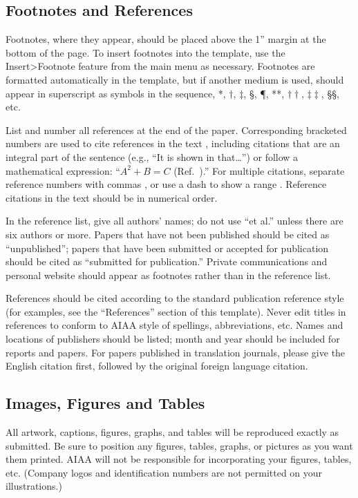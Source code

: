 \subsection{Footnotes and References}
Footnotes, where they appear, should be placed above the 1'' margin at the bottom of the page. To insert footnotes into the template, use the Insert>Footnote feature from the main menu as necessary. Footnotes are formatted automatically in the template, but if another medium is used, should appear in superscript as symbols in the sequence, *, $\dag$, $\ddag$, \S, \P, **, $\dag\dag$, $\ddag\ddag$, \S\S, etc.

List and number all references at the end of the paper. Corresponding bracketed numbers are used to cite references in the text \cite{vatistas1986reverse}, including citations that are an integral part of the sentence (e.g., ``It is shown in \cite{dornheim1996planetary} that\ldots '') or follow a mathematical expression: ``$A^{2} + B = C$ (Ref.~\cite{terster1997nasa}).'' For multiple citations, separate reference numbers with commas \cite{peyret2012computational,oates1997aerothermodynamics}, or use a dash to show a range \cite{volpe1994techniques,thompsonspacecraft,chi1993fluid}. Reference citations in the text should be in numerical order.

In the reference list, give all authors' names; do not use ``et al.'' unless there are six authors or more. Papers that have not been published should be cited as ``unpublished''; papers that have been submitted or accepted for publication should be cited as ``submitted for publication.'' Private communications and personal website should appear as footnotes rather than in the reference list.

References should be cited according to the standard publication reference style (for examples, see the ``References'' section of this template). Never edit titles in references to conform to AIAA style of spellings, abbreviations, etc. Names and locations of publishers should be listed; month and year should be included for reports and papers. For papers published in translation journals, please give the English citation first, followed by the original foreign language citation.

\subsection{Images, Figures and Tables}
All artwork, captions, figures, graphs, and tables will be reproduced exactly as submitted. Be sure to position any figures, tables, graphs, or pictures as you want them printed. AIAA will not be responsible for incorporating your figures, tables, etc. (Company logos and identification numbers are not permitted on your illustrations.)

